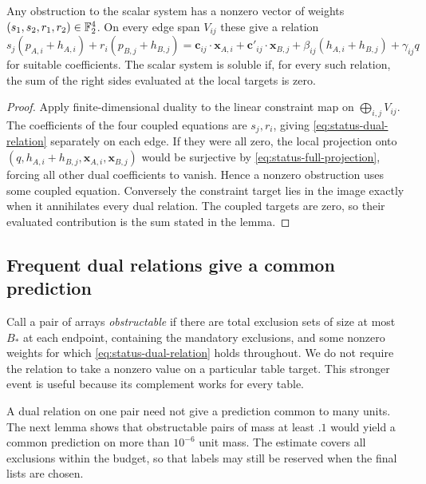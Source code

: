 \begin{lemma}
\label{lem:status-duality}
Any obstruction to the scalar system has a nonzero vector of weights
$(s_1,s_2,r_1,r_2)\in\mathbb F_2^4$. On every edge span $V_{ij}$ these give
a relation
\begin{equation}
\label{eq:status-dual-relation}
s_j(p_{A,i}+h_{A,i})+r_i(p_{B,j}+h_{B,j})
=\mathbf c_{ij}\cdot\mathbf x_{A,i}
 +\mathbf c'_{ij}\cdot\mathbf x_{B,j}
 +\beta_{ij}(h_{A,i}+h_{B,j})+\gamma_{ij}q
\end{equation}
for suitable coefficients. The scalar system is soluble if, for every
such relation, the sum of the right sides evaluated at the local targets
is zero.
\end{lemma}

\begin{proof}
Apply finite-dimensional duality to the linear constraint map on
$\bigoplus_{i,j}V_{ij}$. The coefficients of the four coupled equations
are $s_j,r_i$, giving \eqref{eq:status-dual-relation} separately on each
edge. If they were all zero, the local projection onto
$(q,h_{A,i}+h_{B,j},\mathbf x_{A,i},\mathbf x_{B,j})$ would be
surjective by \eqref{eq:status-full-projection}, forcing all other dual
coefficients to vanish. Hence a nonzero obstruction uses some coupled
equation. Conversely the constraint target lies in the image exactly
when it annihilates every dual relation. The coupled targets are zero,
so their evaluated contribution is the sum stated in the lemma.
\end{proof}

\subsection{Frequent dual relations give a common prediction}

Call a pair of arrays \emph{obstructable} if there are total exclusion
sets of size at most $B_*$ at each endpoint, containing the mandatory
exclusions, and some nonzero weights for which
\eqref{eq:status-dual-relation} holds throughout. We do not require the
relation to take a nonzero value on a particular table target. This
stronger event is useful because its complement works for every table.

A dual relation on one pair need not give a prediction common to many
units. The next lemma shows that obstructable pairs of mass at least
$.1$ would yield a common prediction on more than $10^{-6}$ unit mass.
The estimate covers all exclusions within the budget, so that labels
may still be reserved when the final lists are chosen.

